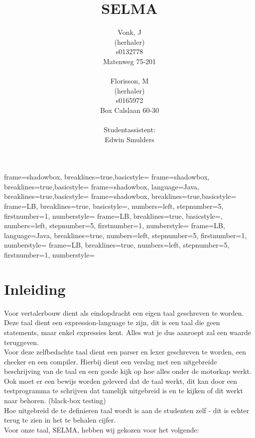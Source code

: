 \documentclass[]{article}
\title{SELMA}
\author{ 
Vonk, J\\
(herhaler)\\
s0132778\\
Matenweg 75-201\\
\\
Florisson, M\\
(herhaler)\\
s0165972\\
Box Calslaan 60-30\\
\\
Studentassistent:\\
Edwin Smulders}
\begin{document}
	{frame=shadowbox, breaklines=true,basicstyle=\footnotesize}
	{frame=shadowbox, breaklines=true,basicstyle=\small}
	{frame=shadowbox, language=Java, breaklines=true,basicstyle=\footnotesize}
	{frame=shadowbox, breaklines=true,basicstyle=\small}
	{frame=LB, breaklines=true, basicstyle=\scriptsize, numbers=left, stepnumber=5, firstnumber=1, numberstyle=\tiny}	
	{frame=LB, breaklines=true, basicstyle=\scriptsize, numbers=left, stepnumber=5, firstnumber=1, numberstyle=\tiny}	
	{frame=LB, language=Java, breaklines=true, numbers=left, stepnumber=5, firstnumber=1, numberstyle=\tiny}	
	{frame=LB, breaklines=true, numbers=left, stepnumber=5, firstnumber=1, numberstyle=\tiny}	

\newcommand{\todo}[1]{\marginpar{\fcolorbox{red}{yellow}{\textbf{#1}}}}



\begin{titlepage}
\maketitle 
\end{titlepage}
\setcounter{secnumdepth}{5}
\setcounter{tocdepth}{5}
\tableofcontents{}

\newpage
\section{Inleiding}
Voor vertalerbouw dient als eindopdracht een eigen taal geschreven te worden. Deze taal dient een expression-language te zijn, dit is een taal die geen statements, maar enkel expressies kent. Alles wat je dus aanroept zal een waarde teruggeven.\\
Voor deze zelfbedachte taal dient een parser en lexer geschreven te worden, een checker en een compiler. Hierbij dient een verslag met een uitgebreide beschrijving van de taal en een goede kijk op hoe alles onder de motorkap werkt. Ook moet er een bewijs worden geleverd dat de taal werkt, dit kan door een testprogramma te schrijven dat tamelijk uitgebreid is en te kijken of dit werkt naar behoren. (black-box testing) \\
Hoe uitgebreid de te definieren taal wordt is aan de studenten zelf - dit is echter terug te zien in het te behalen cijfer.\\
Voor onze taal, SELMA, hebben wij gekozen voor het volgende:
\end{document}
